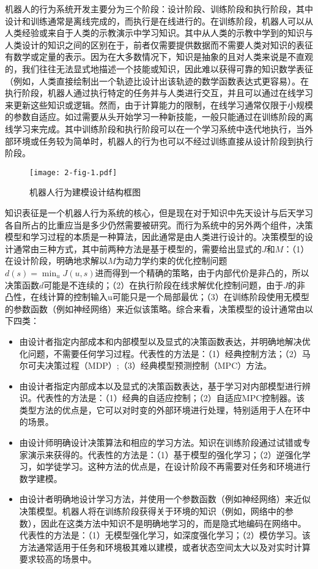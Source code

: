 机器人的行为系统开发主要分为三个阶段：设计阶段、训练阶段和执行阶段，其中设计和训练通常是离线完成的，而执行是在线进行的。在训练阶段，机器人可以从人类经验或来自于人类的示教演示中学习知识。其中从人类的示教中学到的知识与人类设计的知识之间的区别在于，前者仅需要提供数据而不需要人类对知识的表征有数学或定量的表示。因为在大多数情况下，知识是抽象的且对人类来说是不直观的，我们往往无法显式地描述一个技能或知识，因此难以获得可靠的知识数学表征（例如，人类直接绘制出一个轨迹比设计出该轨迹的数学函数表达式更容易）。在执行阶段，机器人通过执行特定的任务并与人类进行交互，并且可以通过在线学习来更新这些知识或逻辑。然而，由于计算能力的限制，在线学习通常仅限于小规模的参数自适应。如过需要从头开始学习一种新技能，一般只能通过在训练阶段的离线学习来完成。其中训练阶段和执行阶段可以在一个学习系统中迭代地执行，当外部环境或任务较为简单时，机器人的行为也可以不经过训练直接从设计阶段到执行阶段。

\begin{figure}[h]
    \centering
    \texttt{[image: 2-fig-1.pdf]}
    \caption{机器人行为建模设计结构框图}
    \label{fig:2-1}
\end{figure}
知识表征是一个机器人行为系统的核心，但是现在对于知识中先天设计与后天学习各自所占的比重应当是多少仍然需要被研究。而行为系统中的另外两个组件，决策模型和学习过程的本质是一种算法，因此通常是由人类进行设计的。决策模型的设计通常由三种方式，其中前两种方法是基于模型的，需要给出显式的$J$和$M$：（1）在设计阶段，明确地求解以$M$为动力学约束的优化控制问题$d(s)=\min_u J(u,s)$进而得到一个精确的策略，由于内部代价是非凸的，所以决策函数$d$可能是不连续的；（2）在执行阶段在线求解优化控制问题，由于$J$的非凸性，在线计算的控制输入u可能只是一个局部最优；（3）在训练阶段使用无模型的参数函数（例如神经网络）来近似该策略。综合来看，决策模型的设计通常由以下四类：

\begin{itemize}
\item 由设计者指定内部成本和内部模型以及显式的决策函数表达，并明确地解决优化问题，不需要任何学习过程。代表性的方法是：（1）经典控制方法；（2）马尔可夫决策过程（MDP）;（3）经典模型预测控制（MPC）方法。
\item 由设计者指定内部成本以及显式的决策函数表达，基于学习对内部模型进行辨识。代表性的方法是：（1）经典的自适应控制；（2）自适应MPC控制器。该类型方法的优点是，它可以对时变的外部环境进行处理，特别适用于人在环中的场景。
\item 由设计师明确设计决策算法和相应的学习方法。知识在训练阶段通过试错或专家演示来获得的。代表性的方法是：（1）基于模型的强化学习；（2）逆强化学习，如学徒学习。这种方法的优点是，在设计阶段不再需要对任务和环境进行数学建模。
\item 由设计者明确地设计学习方法，并使用一个参数函数（例如神经网络）来近似决策模型。机器人将在训练阶段获得关于环境的知识（例如，网络中的参数），因此在这类方法中知识不是明确地学习的，而是隐式地编码在网络中。代表性的方法是：（1）无模型强化学习，如深度强化学习；（2）模仿学习。该方法通常适用于任务和环境极其难以建模，或者状态空间太大以及对实时计算要求较高的场景中。
\end{itemize}

